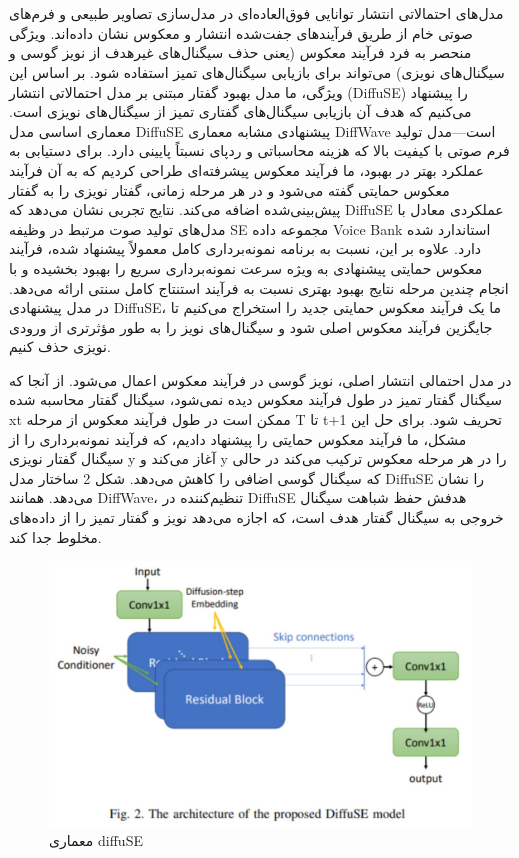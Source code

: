 \documentclass[fleqn]{report}
\begin{document}
\section{}
مدل‌های احتمالاتی انتشار توانایی فوق‌العاده‌ای در مدل‌سازی تصاویر طبیعی و فرم‌های صوتی خام از طریق فرآیندهای جفت‌شده انتشار و معکوس نشان داده‌اند. ویژگی منحصر به فرد فرآیند معکوس (یعنی حذف سیگنال‌های غیرهدف از نویز گوسی و سیگنال‌های نویزی) می‌تواند برای بازیابی سیگنال‌های تمیز استفاده شود. بر اساس این ویژگی، ما مدل بهبود گفتار مبتنی بر مدل احتمالاتی انتشار (DiffuSE) را پیشنهاد می‌کنیم که هدف آن بازیابی سیگنال‌های گفتاری تمیز از سیگنال‌های نویزی است. معماری اساسی مدل DiffuSE پیشنهادی مشابه معماری DiffWave است—مدل تولید فرم صوتی با کیفیت بالا که هزینه محاسباتی و ردپای نسبتاً پایینی دارد. برای دستیابی به عملکرد بهتر در بهبود، ما فرآیند معکوس پیشرفته‌ای طراحی کردیم که به آن فرآیند معکوس حمایتی گفته می‌شود و در هر مرحله زمانی، گفتار نویزی را به گفتار پیش‌بینی‌شده اضافه می‌کند. نتایج تجربی نشان می‌دهد که DiffuSE عملکردی معادل با مدل‌های تولید صوت مرتبط در وظیفه SE مجموعه داده Voice Bank استاندارد شده دارد. علاوه بر این، نسبت به برنامه نمونه‌برداری کامل معمولاً پیشنهاد شده، فرآیند معکوس حمایتی پیشنهادی به ویژه سرعت نمونه‌برداری سریع را بهبود بخشیده و با انجام چندین مرحله نتایج بهبود بهتری نسبت به فرآیند استنتاج کامل سنتی ارائه می‌دهد.
در مدل پیشنهادی DiffuSE، ما یک فرآیند معکوس حمایتی جدید را استخراج می‌کنیم تا جایگزین فرآیند معکوس اصلی شود و سیگنال‌های نویز را به طور مؤثرتری از ورودی نویزی حذف کنیم.

در مدل احتمالی انتشار اصلی، نویز گوسی در فرآیند معکوس اعمال می‌شود. از آنجا که سیگنال گفتار تمیز در طول فرآیند معکوس دیده نمی‌شود، سیگنال گفتار محاسبه شده  xt​ ممکن است در طول فرآیند معکوس از مرحله T تا t+1 تحریف شود. برای حل این مشکل، ما فرآیند معکوس حمایتی را پیشنهاد دادیم، که فرآیند نمونه‌برداری را از سیگنال گفتار نویزی y آغاز می‌کند و y را در هر مرحله معکوس ترکیب می‌کند در حالی که سیگنال گوسی اضافی را کاهش می‌دهد.
شکل 2 ساختار مدل DiffuSE را نشان می‌دهد. همانند DiffWave، تنظیم‌کننده در DiffuSE هدفش حفظ شباهت سیگنال خروجی به سیگنال گفتار هدف است، که اجازه می‌دهد نویز و گفتار تمیز را از داده‌های مخلوط جدا کند. 

\begin{figure}[h]

    \centering
    \includegraphics[width=.8\textwidth, keepaspectratio]{images/diffuSE.jpg}
    
    \caption{معماری diffuSE}
    \label{fig:diffuSE}
\end{figure}
\end{document}
